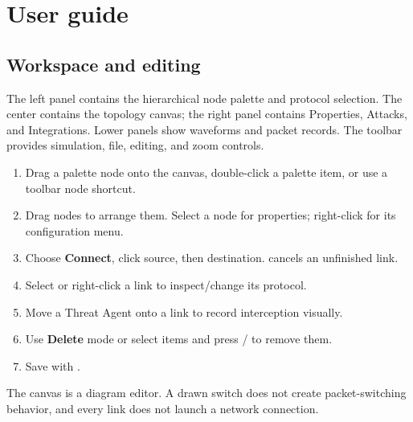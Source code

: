 \chapter{User guide}\label{chapter-3}
\section*{Workspace and editing}
The left panel contains the hierarchical node palette and protocol selection. The center contains the topology canvas; the right panel contains Properties, Attacks, and Integrations. Lower panels show waveforms and packet records. The toolbar provides simulation, file, editing, and zoom controls.

\begin{enumerate}
\item Drag a palette node onto the canvas, double-click a palette item, or use a toolbar node shortcut.
\item Drag nodes to arrange them. Select a node for properties; right-click for its configuration menu.
\item Choose \textbf{Connect}, click source, then destination.  cancels an unfinished link.
\item Select or right-click a link to inspect/change its protocol.
\item Move a Threat Agent onto a link to record interception visually.
\item Use \textbf{Delete} mode or select items and press / to remove them.
\item Save with .
\end{enumerate}

The canvas is a diagram editor. A drawn switch does not create packet-switching behavior, and every link does not launch a network connection.

